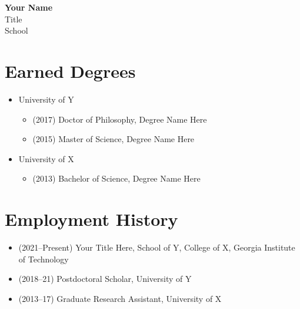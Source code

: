 





\thispagestyle{empty}
\tableofcontents
{}
\newpage

\setcounter{page}{1}
\begin{center}
    {\Large \bf Your Name}  \smallskip \\
    {\large Title} \\
    {\large School}  
\end{center}

\section{Earned Degrees}
\begin{adjustwidth}{2em}{0pt}

\begin{itemize}
    \item University of Y
    \begin{itemize}
        \item[] (2017) Doctor of Philosophy, Degree Name Here
        \item[] (2015) Master of Science, Degree Name Here
    \end{itemize}
    \item University of X
    \begin{itemize}
        \item[] (2013) Bachelor of Science, Degree Name Here
    \end{itemize}
\end{itemize}

\end{adjustwidth}

\section{Employment History}
\begin{adjustwidth}{2em}{0pt}

\begin{itemize}
    \item (2021--Present) Your Title Here, School of Y, College of X, Georgia Institute of Technology
    \item (2018--21) Postdoctoral Scholar, University of Y
    \item (2013--17) Graduate Research Assistant, University of X 
\end{itemize}

\end{adjustwidth}

